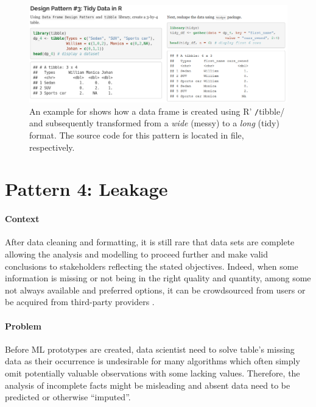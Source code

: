 \begin{figure}[!ht]
\centering
\includegraphics[width=\textwidth+2cm,height=\textheight,keepaspectratio]{images_dp/code_listing_3_td_R}
\caption[Example for Tidy Data Design Pattern.]{An example for  shows how a data frame is created using R' \texttt/tibble/ and subsequently transformed from a \emph{wide} (messy) to a \emph{long} (tidy) format. 
The source code for this pattern is located in  file,  respectively.}
\label{lst:code_pattern4}
\end{figure}

\section{Pattern 4: Leakage}

\paragraph*{Context}
After data cleaning and formatting, it is still rare that data sets are complete allowing the analysis and modelling to proceed further and make valid conclusions to stakeholders reflecting the stated objectives.
Indeed, when some information is missing or not being in the right quality and quantity, among some not always available and preferred options, it can be crowdsourced from users or be acquired from third-party providers \parencites{Domino2017DS}.

\paragraph*{Problem}
Before \ac{ML} prototypes are created, data scientist need to solve table's missing data as their occurrence is undesirable for many algorithms which often simply omit potentially valuable observations with some lacking values. 
Therefore, the analysis of incomplete facts might be misleading and absent data need to be predicted or otherwise \enquote{imputed}.

